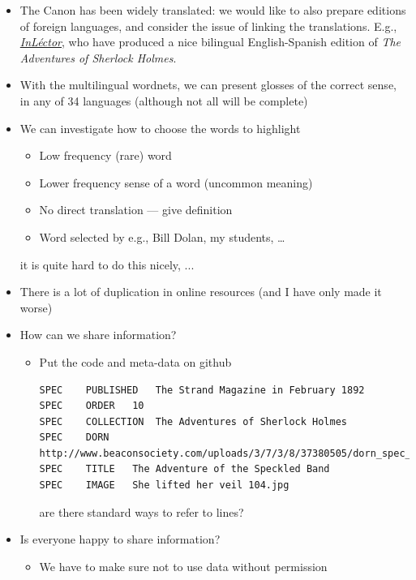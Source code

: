\documentclass[a4paper,landscape,headrule,footrule,xetex]{foils}
\begin{document}
\begin{itemize}
\item The Canon has been widely translated: we would like to also
  prepare editions of foreign languages, and consider the issue of
  linking the translations.  E.g.,   \href{https://inlector.wordpress.com/2013/01/15/the-adventures-of-sherlock-holmes/}{\textit{InLéctor}},
  who have produced a nice bilingual English-Spanish edition of
  \textit{The Adventures of Sherlock Holmes}.

\item With the multilingual wordnets, we can present glosses of the
  correct sense, in any of 34 languages (although not all will be
  complete)

\item We can investigate how to choose the words to highlight
  \begin{itemize}
  \item Low frequency (rare) word
  \item Lower frequency sense of a word (uncommon meaning)
  \item No direct translation --- give definition
  \item Word selected by e.g., Bill Dolan, my students, \ldots
  \end{itemize}
 it is quite hard to do this nicely, ... 

\end{itemize}


\begin{itemize}
\item There is a lot of duplication in online resources (and I have
  only made it worse)

\item How can we share information?
  \begin{itemize}
  \item Put the code and meta-data on github
\begin{verbatim}
SPEC	PUBLISHED	The Strand Magazine in February 1892
SPEC	ORDER	10
SPEC	COLLECTION	The Adventures of Sherlock Holmes
SPEC	DORN	http://www.beaconsociety.com/uploads/3/7/3/8/37380505/dorn_spec_study_guide.pdf
SPEC	TITLE	The Adventure of the Speckled Band
SPEC	IMAGE	She lifted her veil	104.jpg
\end{verbatim}
    are there standard ways to refer to lines? 
  \end{itemize}
\item Is everyone happy to share information?
  \begin{itemize}
  \item We have to make sure not to use data without permission
  \end{itemize}
\end{itemize}
\end{document}
